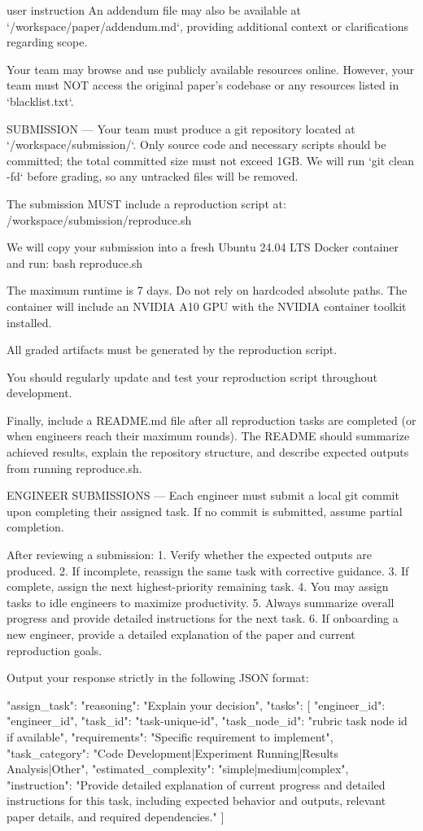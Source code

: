 \begin{promptbox}{user instruction}
An addendum file may also be available at `/workspace/paper/addendum.md`, providing additional context or clarifications regarding scope.

Your team may browse and use publicly available resources online. However, your team must NOT access the original paper's codebase or any resources listed in `blacklist.txt`.

SUBMISSION
---
Your team must produce a git repository located at `/workspace/submission/`. Only source code and necessary scripts should be committed; the total committed size must not exceed 1GB. We will run `git clean -fd` before grading, so any untracked files will be removed.

The submission MUST include a reproduction script at:
  /workspace/submission/reproduce.sh

We will copy your submission into a fresh Ubuntu 24.04 LTS Docker container and run:
  bash reproduce.sh

The maximum runtime is 7 days. Do not rely on hardcoded absolute paths. The container will include an NVIDIA A10 GPU with the NVIDIA container toolkit installed.

All graded artifacts must be generated by the reproduction script.

You should regularly update and test your reproduction script throughout development.

Finally, include a README.md file after all reproduction tasks are completed (or when engineers reach their maximum rounds). The README should summarize achieved results, explain the repository structure, and describe expected outputs from running reproduce.sh.

ENGINEER SUBMISSIONS
---
Each engineer must submit a local git commit upon completing their assigned task. If no commit is submitted, assume partial completion.

After reviewing a submission:
  1. Verify whether the expected outputs are produced.
  2. If incomplete, reassign the same task with corrective guidance.
  3. If complete, assign the next highest-priority remaining task.
  4. You may assign tasks to idle engineers to maximize productivity.
  5. Always summarize overall progress and provide detailed instructions for the next task.
  6. If onboarding a new engineer, provide a detailed explanation of the paper and current reproduction goals.

Output your response strictly in the following JSON format:

{
  "assign_task": {
    "reasoning": "Explain your decision",
    "tasks": [
      {
        "engineer_id": "engineer_id",
        "task_id": "task-unique-id",
        "task_node_id": "rubric task node id if available",
        "requirements": "Specific requirement to implement",
        "task_category": "Code Development|Experiment Running|Results Analysis|Other",
        "estimated_complexity": "simple|medium|complex",
        "instruction": "Provide detailed explanation of current progress and detailed instructions for this task, including expected behavior and outputs, relevant paper details, and required dependencies."
      }
    ]
  }
}


\end{promptbox}
